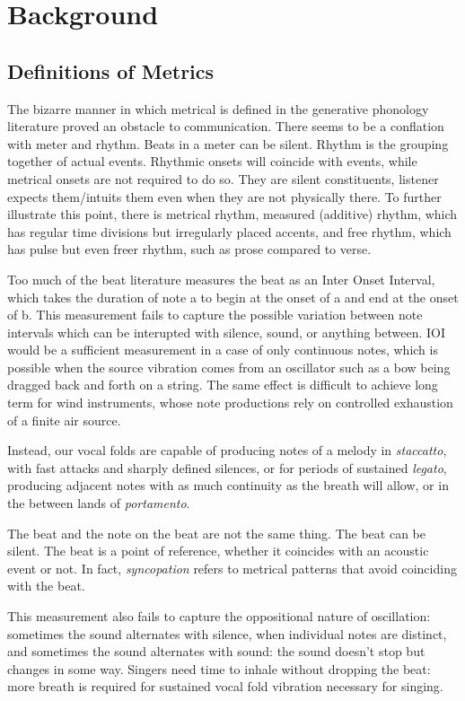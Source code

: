 \chapter{Background}

\section{Definitions of Metrics} 

The bizarre manner in which metrical is defined in the generative phonology literature proved an obstacle to communication. 
There seems to be a conflation with meter and rhythm. Beats in a meter can be silent. Rhythm is the grouping together of actual events. Rhythmic onsets will coincide with events, while metrical onsets are not required to do so. They are silent constituents, listener expects them/intuits them even when they are not physically there. To further illustrate this point, there is metrical rhythm, measured (additive) rhythm, which has regular time divisions but irregularly placed accents, and free rhythm, which has pulse but even freer rhythm, such as prose compared to verse. 


Too much of the beat literature measures the beat as an Inter Onset Interval, which takes the duration of note a to begin at the onset of a and end at the onset of b. This measurement fails to capture the possible variation between note intervals which can be interupted with silence, sound, or anything between. IOI would be a sufficient measurement in a case of only continuous notes, which is possible when the source vibration comes from an oscillator such as a bow being dragged back and forth on a string. The same effect is difficult to achieve long term for wind instruments, whose note productions rely on controlled exhaustion of a finite air source. 

Instead, our vocal folds are capable of producing notes of a melody in {\it staccatto}, with fast attacks and sharply defined silences, or for periods of sustained {\it legato}, producing adjacent notes with as much continuity as the breath will allow, or in the between lands of {\it portamento}. 

The beat and the note on the beat are not the same thing. The beat can be silent. The beat is a point of reference, whether it coincides with an acoustic event or not. In fact, {\it syncopation} refers to metrical patterns that avoid coinciding with the beat. 

This measurement also fails to capture the oppositional nature of oscillation: sometimes the sound alternates with silence, when individual notes are distinct, and sometimes the sound alternates with sound: the sound doesn't stop but changes in some way. Singers need time to inhale without dropping the beat: more breath is required for sustained vocal fold vibration necessary for singing. 

